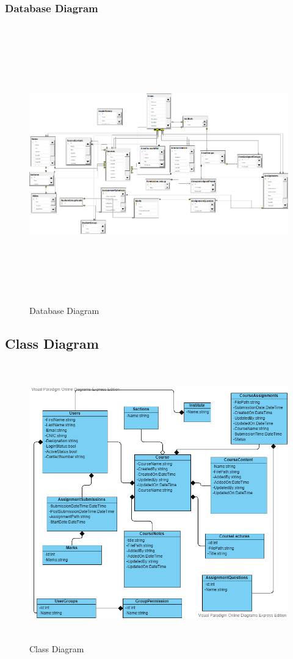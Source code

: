 \documentclass[12pt]{article}
\begin{document}
\newpage
\subsubsection{Database Diagram}
\begin{figure}[h]
\begin{center}
\includegraphics[width=13cm, height=12cm]{DatabaseDiagramv3}
\caption{Database Diagram}
\end{center}
\end{figure}

\newpage

\subsection{Class Diagram}
\begin{figure}[h]
\begin{center}
\includegraphics[width=13cm, height=12cm]{DBMClassDiagram}
\caption{Class Diagram}
\end{center}
\end{figure}
\end{document}
